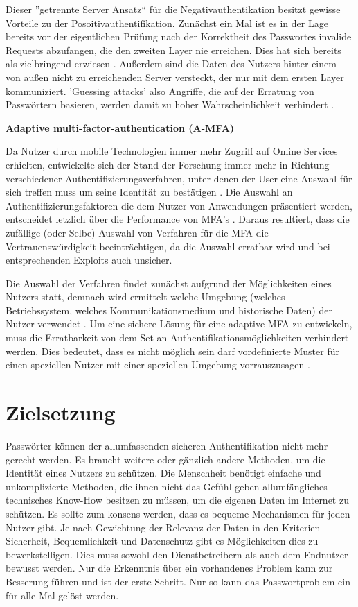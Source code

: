 Dieser ''getrennte Server Ansatz`` für die Negativauthentikation besitzt gewisse Vorteile zu der Posoitivauthentifikation. Zunächst ein Mal ist es in der Lage bereits vor der eigentlichen Prüfung nach der Korrektheit des Passwortes invalide Requests abzufangen, die den zweiten Layer nie erreichen. Dies hat sich bereits als zielbringend erwiesen \cite{A14}. Außerdem sind die Daten des Nutzers hinter einem von außen nicht zu erreichenden Server versteckt, der nur mit dem ersten Layer kommuniziert. 'Guessing attacks' also Angriffe, die auf der Erratung von Passwörtern basieren, werden damit zu hoher Wahrscheinlichkeit verhindert \cite{A11}.

\textbf{Adaptive multi-factor-authentication (A-MFA)}

Da Nutzer durch mobile Technologien immer mehr Zugriff auf Online Services erhielten, entwickelte sich der Stand der Forschung immer mehr in Richtung verschiedener Authentifizierungsverfahren, unter denen der User eine Auswahl für sich treffen muss um seine Identität zu bestätigen \cite{A11}. Die Auswahl an Authentifizierungsfaktoren die dem Nutzer von Anwendungen präsentiert werden, entscheidet letzlich über die Performance von MFA's \cite{A11}. Daraus resultiert, dass die zufällige (oder Selbe) Auswahl von Verfahren für die MFA die Vertrauenswürdigkeit beeinträchtigen, da die Auswahl erratbar wird und bei entsprechenden Exploits auch unsicher. 

Die Auswahl der Verfahren findet zunächst aufgrund der Möglichkeiten eines Nutzers statt, demnach wird ermittelt welche Umgebung (welches Betriebssystem, welches Kommunikationsmedium und historische Daten) der Nutzer verwendet \cite{A15}. Um eine sichere Lösung für eine adaptive MFA zu entwickeln, muss die Erratbarkeit von dem Set an Authentifikationsmöglichkeiten verhindert werden. Dies bedeutet, dass es nicht möglich sein darf vordefinierte Muster für einen speziellen Nutzer mit einer speziellen Umgebung vorrauszusagen \cite{11}.

\section{Zielsetzung}
Passwörter können der allumfassenden sicheren Authentifikation nicht mehr gerecht werden. Es braucht weitere oder gänzlich andere Methoden, um die Identität eines Nutzers zu schützen. Die Menschheit benötigt einfache und unkomplizierte Methoden, die ihnen nicht das Gefühl geben allumfängliches technisches Know-How besitzen zu müssen, um die eigenen Daten im Internet zu schützen. Es sollte zum konsens werden, dass es bequeme Mechanismen für jeden Nutzer gibt. Je nach Gewichtung der Relevanz der Daten in den Kriterien Sicherheit, Bequemlichkeit und Datenschutz gibt es Möglichkeiten dies zu bewerkstelligen. Dies muss sowohl den Dienstbetreibern als auch dem Endnutzer bewusst werden. Nur die Erkenntnis über ein vorhandenes Problem kann zur Besserung führen und ist der erste Schritt. Nur so kann das Passwortproblem ein für alle Mal gelöst werden.

